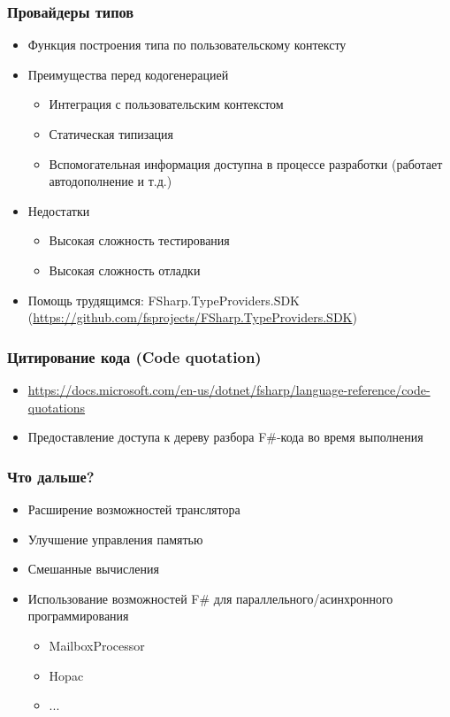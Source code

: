 \documentclass[xcolor=table]{beamer}
\begin{document}
\begin{frame}[fragile]
  \transwipe[direction=90]
  \frametitle{Провайдеры типов}
  \begin {itemize}
  \item Функция построения типа по пользовательскому контексту
  \item Преимущества перед кодогенерацией
  \begin {itemize}
   \item Интеграция с пользовательским контекстом
   \item Статическая типизация
   \item Вспомогательная информация доступна в процессе разработки (работает автодополнение и т.д.)
  \end {itemize}

  \item Недостатки
  \begin {itemize}
    \item Высокая сложность тестирования
    \item Высокая сложность отладки
  \end {itemize}
  \item Помощь трудящимся: FSharp.TypeProviders.SDK (\url{https://github.com/fsprojects/FSharp.TypeProviders.SDK})
\end {itemize}
\end{frame}

\begin{frame}[fragile]
  \transwipe[direction=90]
  \frametitle{Цитирование кода (Code quotation)}
  \begin{itemize}
  \item \url{https://docs.microsoft.com/en-us/dotnet/fsharp/language-reference/code-quotations}
  \item Предоставление доступа к дереву разбора F\#-кода во время выполнения
  \end{itemize}
\end{frame}

\begin{frame}
  \transwipe[direction=90]
  \frametitle{Что дальше?}
\begin{itemize} 
\item Расширение возможностей транслятора
\item Улучшение управления памятью
\item Смешанные вычисления
\item Использование возможностей F\# для параллельного/асинхронного программирования
\begin{itemize} 
  \item MailboxProcessor
  \item Hopac
  \item ...
\end{itemize}
\end{itemize}

\end{frame}
\end{document}
